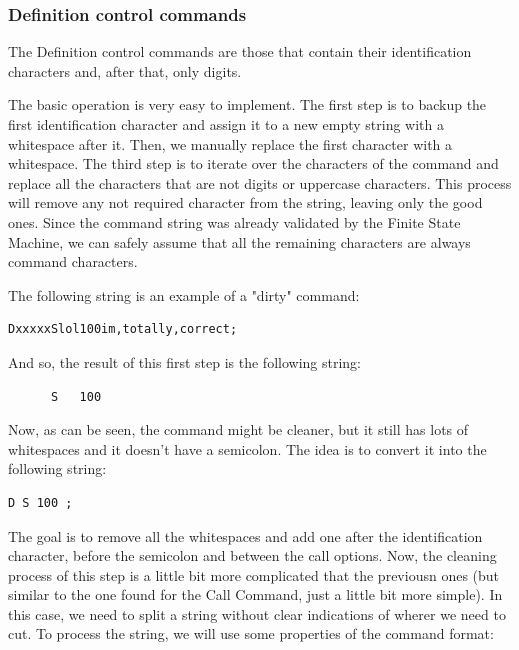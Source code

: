 \documentclass[11pt,twoside,openany,x11names,svgnames]{memoir}
\begin{document}
\subsubsection{Definition control commands}\label{Definition-control-commands}

The Definition control commands are those that contain their identification characters and, after that, only digits.

The basic operation is very easy to implement. The first step is to backup the first identification character and assign it to a new empty string with a whitespace after it. Then, we manually replace the first character with a whitespace. The third step is to iterate over the characters of the command and replace all the characters that are not digits or uppercase characters. This process will remove any not required character from the string, leaving only the good ones. Since the command string was already validated by the Finite State Machine, we can safely assume that all the remaining characters are always command characters.

The following string is an example of a "dirty" command:

\begin{verbatim}
DxxxxxSlol100im,totally,correct;
\end{verbatim}

And so, the result of this first step is the following string:

\begin{verbatim}
      S   100                   
\end{verbatim}

Now, as can be seen, the command might be cleaner, but it still has lots of whitespaces and it doesn't have a semicolon. The idea is to convert it into the following string:

\begin{verbatim}
D S 100 ;
\end{verbatim}

The goal is to remove all the whitespaces and add one after the identification character, before the semicolon and between the call options. Now, the cleaning process of this step is a little bit more complicated that the previousn ones (but similar to the one found for the Call Command, just a little bit more simple). In this case, we need to split a string without clear indications of wherer we need to cut. To process the string, we will use some properties of the command format:
\end{document}
